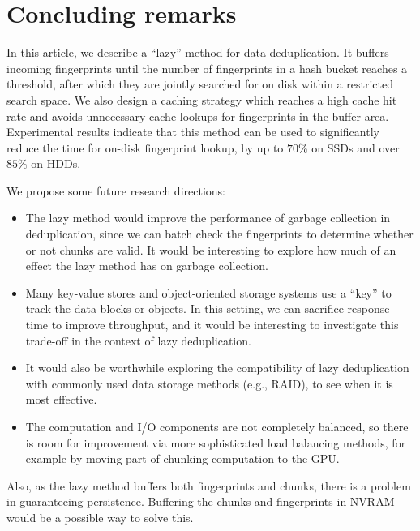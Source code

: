 \documentclass[prodmode,acmtecs]{acmsmall}
\begin{document}
\section{Concluding remarks}
\label{sec:conclusion}

In this article, we describe a ``lazy'' method for data deduplication. It buffers incoming fingerprints until the number of fingerprints in a hash bucket reaches a threshold, after which they are jointly searched for on disk within a restricted search space.  We also design a caching strategy which reaches a high cache hit rate and avoids unnecessary cache lookups for fingerprints in the buffer area.  Experimental results indicate that this method can be used to significantly reduce the time for on-disk fingerprint lookup, by up to $70\%$ on SSDs and over $85\%$ on HDDs.

We propose some future research directions:
\begin{itemize}
 \item The lazy method would improve the performance of garbage collection in deduplication, since we can batch check the fingerprints to determine whether or not chunks are valid. It would be interesting to explore how much of an effect the lazy method has on garbage collection.
 \item Many key-value stores and object-oriented storage systems use a ``key'' to track the data blocks or objects. In this setting, we can sacrifice response time to improve throughput, and it would be interesting to investigate this trade-off in the context of lazy deduplication.
 \item It would also be worthwhile exploring the compatibility of lazy deduplication with commonly used data storage methods (e.g., RAID), to see when it is most effective.
 \item The computation and I/O components are not completely balanced, so there is room for improvement via more sophisticated load balancing methods, for example by moving part of chunking computation to the GPU.
\end{itemize}

Also, as the lazy method buffers both fingerprints and chunks, there is a problem in guaranteeing persistence. Buffering the chunks and fingerprints in NVRAM would be a possible way to solve this.





%




\medskip
\end{document}

